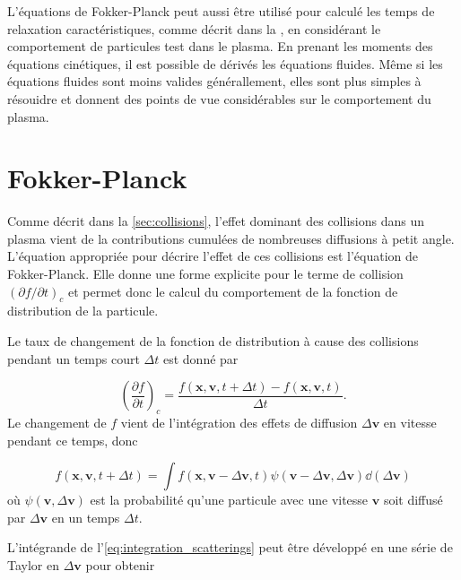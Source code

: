 \documentclass[main.tex]{subfiles}
\begin{document}
L'équations de Fokker-Planck peut aussi être utilisé pour calculé les temps de relaxation caractéristiques, comme décrit dans la \color{red}{Section 2.14 (lien à rajouter quand elle sera faite)}\color{black}, en considérant le comportement de particules test dans le plasma.
En prenant les moments des équations cinétiques, il est possible de dérivés les équations fluides.
Même si les équations fluides sont moins valides générallement, elles sont plus simples à résouidre et donnent des points de vue considérables sur le comportement du plasma.

\section{Fokker-Planck}
\label{sec:fokker_planck}

Comme décrit dans la \autoref{sec:collisions}, l'effet dominant des collisions dans un plasma vient de la contributions cumulées de nombreuses diffusions à petit angle.
L'équation appropriée pour décrire l'effet de ces collisions est l'équation de Fokker-Planck.
Elle donne une forme explicite pour le terme de collision \( \left( \partial f / \partial t \right)_c \) et permet donc le calcul du comportement de la fonction de distribution de la particule.

Le taux de changement de la fonction de distribution à cause des collisions pendant un temps court \( \Delta t \) est donné par

\begin{equation}
	\left( \frac{\partial f}{\partial t} \right)_c = \frac{f \left( \bm{x}, \bm{v}, t + \Delta t\right) - f \left( \bm{x}, \bm{v}, t\right)}{\Delta t}.
	\label{eq:taux_fonction_distribution}
\end{equation}
Le changement de \( f \) vient de l'intégration des effets de diffusion \( \Delta \bm{v} \) en vitesse pendant ce temps, donc

\begin{equation}
	f \left( \bm{x}, \bm{v}, t + \Delta t\right) = \int f \left( \bm{x}, \bm{v} - \Delta  \bm{v}, t\right) \psi \left(\bm{v} - \Delta \bm{v}, \Delta \bm{v} \right) \dd \left( \Delta \bm{v} \right)
	\label{eq:integration_scatterings}
\end{equation}
où \( \psi \left( \bm{v}, \Delta \bm{v} \right) \) est la probabilité qu'une particule avec une vitesse \( \bm{v} \) soit diffusé par \( \Delta \bm{v} \) en un temps \( \Delta t \).

L'intégrande de l'\autoref{eq:integration_scatterings} peut être développé en une série de Taylor en \( \Delta \bm{v} \) pour obtenir
\end{document}
